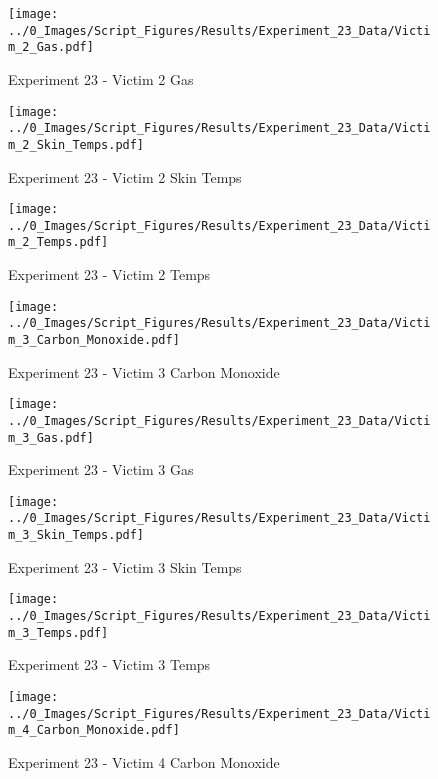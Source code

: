 	\clearpage

	\begin{figure}[H]
		\centering
		\texttt{[image: ../0\_Images/Script\_Figures/Results/Experiment\_23\_Data/Victim\_2\_Gas.pdf]}
		\caption[]{Experiment 23 - Victim 2 Gas}
	\end{figure}
 

	\begin{figure}[H]
		\centering
		\texttt{[image: ../0\_Images/Script\_Figures/Results/Experiment\_23\_Data/Victim\_2\_Skin\_Temps.pdf]}
		\caption[]{Experiment 23 - Victim 2 Skin Temps}
	\end{figure}
 
	\clearpage

	\begin{figure}[H]
		\centering
		\texttt{[image: ../0\_Images/Script\_Figures/Results/Experiment\_23\_Data/Victim\_2\_Temps.pdf]}
		\caption[]{Experiment 23 - Victim 2 Temps}
	\end{figure}
 

	\begin{figure}[H]
		\centering
		\texttt{[image: ../0\_Images/Script\_Figures/Results/Experiment\_23\_Data/Victim\_3\_Carbon\_Monoxide.pdf]}
		\caption[]{Experiment 23 - Victim 3 Carbon Monoxide}
	\end{figure}
 
	\clearpage

	\begin{figure}[H]
		\centering
		\texttt{[image: ../0\_Images/Script\_Figures/Results/Experiment\_23\_Data/Victim\_3\_Gas.pdf]}
		\caption[]{Experiment 23 - Victim 3 Gas}
	\end{figure}
 

	\begin{figure}[H]
		\centering
		\texttt{[image: ../0\_Images/Script\_Figures/Results/Experiment\_23\_Data/Victim\_3\_Skin\_Temps.pdf]}
		\caption[]{Experiment 23 - Victim 3 Skin Temps}
	\end{figure}
 
	\clearpage

	\begin{figure}[H]
		\centering
		\texttt{[image: ../0\_Images/Script\_Figures/Results/Experiment\_23\_Data/Victim\_3\_Temps.pdf]}
		\caption[]{Experiment 23 - Victim 3 Temps}
	\end{figure}
 

	\begin{figure}[H]
		\centering
		\texttt{[image: ../0\_Images/Script\_Figures/Results/Experiment\_23\_Data/Victim\_4\_Carbon\_Monoxide.pdf]}
		\caption[]{Experiment 23 - Victim 4 Carbon Monoxide}
	\end{figure}
 
